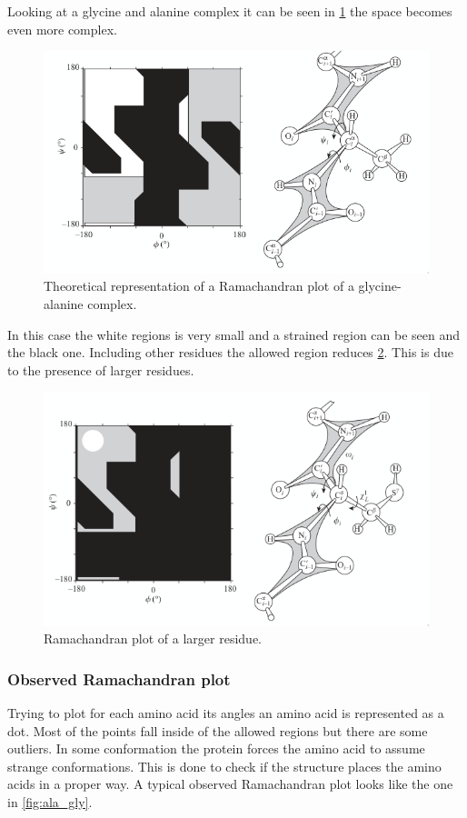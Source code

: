 		Looking at a glycine and alanine complex it can be seen in \ref{fig:ala_gly-theo} the space becomes even more complex.

	\begin{figure}[H]
		\centering
		\includegraphics[width=\textwidth]{ala-gly-theo.png}
		\caption{Theoretical representation of a Ramachandran plot of a glycine-alanine complex.}
		\label{fig:ala_gly-theo}
	\end{figure}

	In this case the white regions is very small and a strained region can be seen and the black one.
	Including other residues the allowed region reduces \ref{fig:ramachandran-final}.
	This is due to the presence of larger residues.

	\begin{figure}[H]
		\centering
		\includegraphics[width=\textwidth]{ramachandran-final.png}
		\caption{Ramachandran plot of a larger residue.}
		\label{fig:ramachandran-final}
	\end{figure}

		\subsubsection{Observed Ramachandran plot}
		Trying to plot for each amino acid its angles an amino acid is represented as a dot.
		Most of the points fall inside of the allowed regions but there are some outliers.
		In some conformation the protein forces the amino acid to assume strange conformations.
		This is done to check if the structure places the amino acids in a proper way.
		A typical observed Ramachandran plot looks like the one in \ref{fig:ala_gly}.

